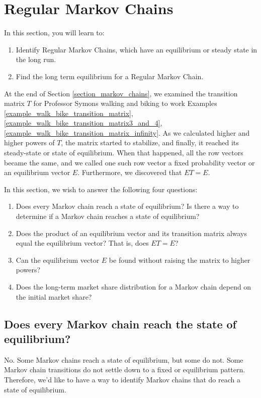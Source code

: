 \section{Regular Markov Chains}

In this section, you will learn to:
\begin{enumerate}
    \item Identify Regular Markov Chains, which have an equilibrium or steady state in the long run.
    \item Find the long term equilibrium for a Regular Markov Chain.
\end{enumerate}

At the end of Section \ref{section_markov_chains}, we examined the transition matrix \( T \) for Professor Symons walking and biking to work Examples \ref{example_walk_bike_transition_matrix}, \ref{example_walk_bike_transition_matrix3_and_4}, \ref{example_walk_bike_transition_matrix_infinity}. As we calculated higher and higher powers of \( T \), the matrix started to stabilize, and finally, it reached its steady-state or state of equilibrium. When that happened, all the row vectors became the same, and we called one such row vector a fixed probability vector or an equilibrium vector \( E \). Furthermore, we discovered that \( ET = E \).

In this section, we wish to answer the following four questions:
\begin{enumerate}
    \item Does every Markov chain reach a state of equilibrium? Is there a way to determine if a Markov chain reaches a state of equilibrium?
    \item Does the product of an equilibrium vector and its transition matrix always equal the equilibrium vector? That is, does \( ET = E \)?
    \item Can the equilibrium vector \( E \) be found without raising the matrix to higher powers?
    \item Does the long-term market share distribution for a Markov chain depend on the initial market share?
\end{enumerate}

\subsection{Does every Markov chain reach the state of equilibrium?}

No. Some Markov chains reach a state of equilibrium, but some do not. Some Markov chain transitions do not settle down to a fixed or equilibrium pattern. Therefore, we'd like to have a way to identify Markov chains that do reach a state of equilibrium.

